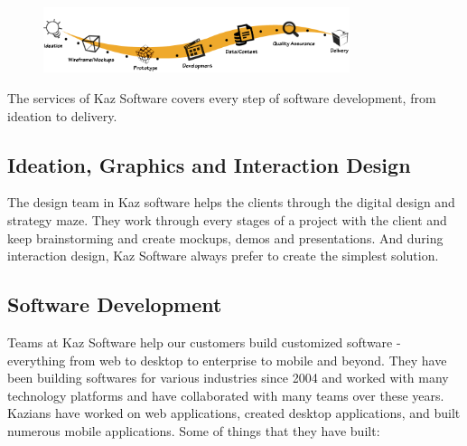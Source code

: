 \begin{figure}[h]
    \begin{center}
        \includegraphics[width= 0.8\textwidth]{images/Chapter2/kaz_services.png}  
        \label{fig:kazServices}
    \end{center}
\end{figure}

The services of Kaz Software covers every step of software development, from ideation to delivery.

\subsection{Ideation, Graphics and Interaction Design}

The design team in Kaz software helps the clients through the digital design and strategy maze.
They work through every stages of a project with the client and keep brainstorming and create mockups, demos and presentations.
And during interaction design, Kaz Software always prefer to create the simplest solution.

\subsection{Software Development}

Teams at Kaz Software help our customers build  customized software - everything from web to desktop to enterprise to mobile and beyond.
They have been building softwares for various industries since 2004 and worked with many technology platforms and have collaborated with many teams over these years. \\

Kazians have worked on web applications, created desktop applications, and built numerous mobile applications. Some of things that they have built:

